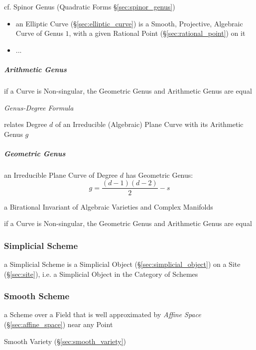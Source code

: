 \fist cf. Spinor Genus (Quadratic Forms \S\ref{sec:spinor_genus})

\begin{itemize}
  \item an Elliptic Curve (\S\ref{sec:elliptic_curve}) is a Smooth, Projective,
    Algebraic Curve of Genus $1$, with a given Rational Point
    (\S\ref{sec:rational_point}) on it
  \item ...
\end{itemize}



\subparagraph{Arithmetic Genus}\label{sec:arithmetic_genus}\hfill

if a Curve is Non-singular, the Geometric Genus and Arithmetic Genus are equal

\emph{Genus-Degree Formula}

relates Degree $d$ of an Irreducible (Algebraic) Plane Curve with its Arithmetic
Genus $g$



\subparagraph{Geometric Genus}\label{sec:geometric_genus}\hfill

an Irreducible Plane Curve of Degree $d$ has Geometric Genus:
\[
  g = \frac{(d-1)(d-2)}{2} - s
\]

a Birational Invariant of Algebraic Varieties and Complex Manifolds

if a Curve is Non-singular, the Geometric Genus and Arithmetic Genus are equal



\subsubsection{Simplicial Scheme}\label{sec:simplicial_scheme}

a Simplicial Scheme is a Simplicial Object (\S\ref{sec:simplicial_object}) on a
Site (\S\ref{sec:site}), i.e. a Simplicial Object in the Category of Schemes



\subsubsection{Smooth Scheme}\label{sec:smooth_scheme}

a Scheme over a Field that is well approximated by \emph{Affine Space}
(\S\ref{sec:affine_space}) near any Point

Smooth Variety (\S\ref{sec:smooth_variety})



